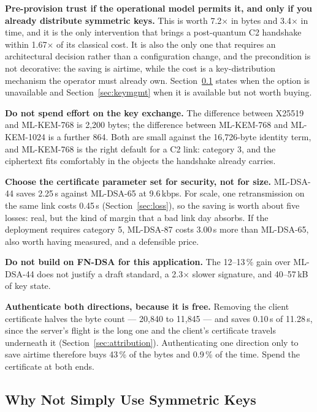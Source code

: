 \documentclass[drones,article,submit,pdftex,moreauthors]{Definitions/mdpi}
\newcommand{\kbps}{kbps}
\newcommand{\mlkem}{ML-KEM}
\newcommand{\mldsa}{ML-DSA}
\newcommand{\fndsa}{FN-DSA}
\begin{document}
\textbf{Pre-provision trust if the operational model permits it, and
only if you already distribute symmetric keys.} This is worth
7.2$\times$ in bytes and 3.4$\times$ in time, and it is the only
intervention that brings a post-quantum C2 handshake within
1.67$\times$ of its classical cost. It is also the only one that
requires an architectural decision rather than a configuration change,
and the precondition is not decorative: the saving is airtime, while the
cost is a key-distribution mechanism the operator must already own.
Section~\ref{sec:alternatives} states when the option is unavailable and
Section~\ref{sec:keymgmt} when it is available but not worth buying.

\textbf{Do not spend effort on the key exchange.} The difference between
X25519 and \mlkem{}-768 is 2{,}200 bytes; the difference between
\mlkem{}-768 and \mlkem{}-1024 is a further 864. Both are small against
the 16{,}726-byte identity term, and \mlkem{}-768 is the right default
for a C2 link: category 3, and the ciphertext fits comfortably in the
objects the handshake already carries.

\textbf{Choose the certificate parameter set for security, not for
size.} \mldsa{}-44 saves 2.25\,s against \mldsa{}-65 at 9.6\,\kbps{}.
For scale, one retransmission on the same link costs 0.45\,s
(Section~\ref{sec:loss}), so the saving is worth about five losses:
real, but the kind of margin that a bad link day absorbs. If the
deployment requires category 5, \mldsa{}-87 costs 3.00\,s more than
\mldsa{}-65, also worth having measured, and a defensible price.

\textbf{Do not build on \fndsa{} for this application.} The 12--13\,\%
gain over \mldsa{}-44 does not justify a draft standard, a 2.3$\times$
slower signature, and 40--57\,kB of key state.

\textbf{Authenticate both directions, because it is free.} Removing the
client certificate halves the byte count --- 20{,}840 to 11{,}845 ---
and saves 0.10\,s of 11.28\,s, since the server's flight is the long
one and the client's certificate travels underneath it
(Section~\ref{sec:attribution}). Authenticating one direction only to
save airtime therefore buys 43\,\% of the bytes and 0.9\,\% of the
time. Spend the certificate at both ends.

\subsection{Why Not Simply Use Symmetric Keys}
\label{sec:alternatives}
\end{document}
